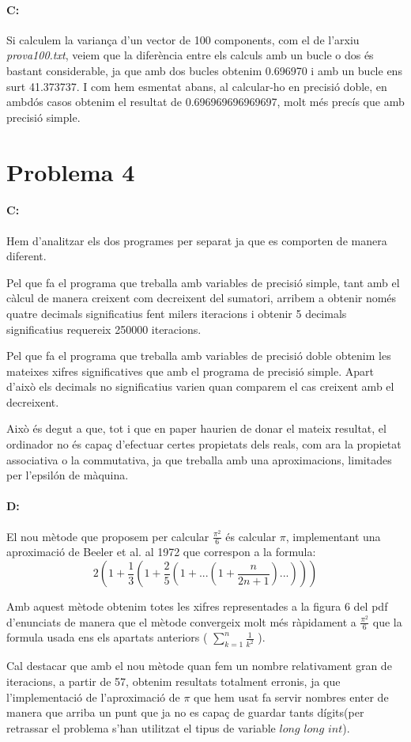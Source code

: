 \documentclass{article}
\begin{document}
	\paragraph{C:} Si calculem la variança d'un vector de 100 components, com el de l'arxiu \textit{prova100.txt}, veiem que la diferència entre els calculs amb un bucle o dos és bastant considerable, ja que amb dos bucles obtenim 0.696970 i amb un bucle ens surt 41.373737. I com hem esmentat abans, al calcular-ho en precisió doble, en ambdós casos obtenim el resultat de 0.696969696969697, molt més precís que amb precisió simple.
	
	\newpage
	
	\section{Problema 4}
	\paragraph{C:} Hem d'analitzar els dos programes per separat ja que es comporten de manera diferent.
    
    Pel que fa el programa que treballa amb variables de precisió simple, tant amb el càlcul de manera creixent com decreixent del sumatori, arribem a obtenir només quatre decimals significatius fent milers iteracions i obtenir 5 decimals significatius requereix 250000 iteracions.
    
    Pel que fa el programa que treballa amb variables de precisió doble obtenim les mateixes xifres significatives que amb el programa de precisió simple. Apart d'això els decimals no significatius varien quan comparem el cas creixent amb el decreixent.
    
    Això és degut a que, tot i que en paper haurien de donar el mateix resultat, el ordinador no és capaç d'efectuar certes propietats dels reals, com ara la propietat associativa o la commutativa, ja que treballa amb una aproximacions, limitades per l'epsilón de màquina.
    
    \paragraph{D:} El nou mètode que proposem per calcular $\frac{\pi^2}{6}$ és calcular $\pi$, implementant una aproximació de Beeler et al. al 1972 que correspon a la formula:
    $$2(1+\frac{1}{3}(1+\frac{2}{5}(1+...(1+\frac{n}{2n+1})...)))$$
    
    Amb aquest mètode obtenim totes les xifres representades a la figura 6 del pdf d'enunciats de manera que el mètode convergeix molt més ràpidament a $\frac{\pi^2}{6}$ que la formula usada ens els apartats anteriors ( $\sum_{k=1}^{n} \frac{1}{k^2}$ ).
    
    Cal destacar que amb el nou mètode quan fem un nombre relativament gran de iteracions, a partir de 57, obtenim resultats totalment erronis, ja que l'implementació de l'aproximació de $\pi$ que hem usat fa servir nombres enter de manera que arriba un punt que ja no es capaç de guardar tants dígits(per retrassar el problema s'han utilitzat el tipus de variable $long$ $long$ $ int$).
 
\end{document}
